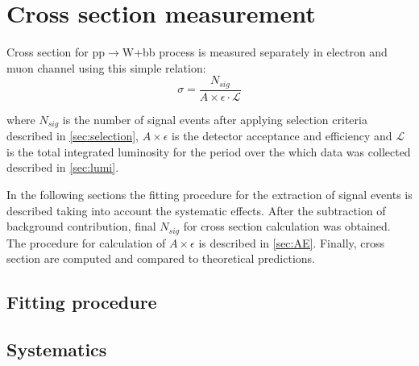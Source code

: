 
\chapter{Cross section measurement} %

\label{Chapter7} %



Cross section for pp$\rightarrow$W+bb process is measured separately in electron and muon channel using this simple relation:
\begin{equation}
\sigma = \frac{N_{sig}}{A\times \epsilon \cdot \mathcal{L}}
\end{equation}

where $N_{sig}$ is the number of signal events after applying selection criteria described in \ref{sec:selection}, $A\times \epsilon$ is the detector acceptance and efficiency and $\mathcal{L}$ is the total integrated luminosity for the period over the which data was collected described in \ref{sec:lumi}. 
\par In the following sections the fitting procedure for the extraction of signal events is described taking into account the systematic effects. After the subtraction of background contribution, final $N_{sig}$ for cross section calculation was obtained. The procedure for calculation of $A\times \epsilon$ is described in \ref{sec:AE}. Finally, cross section are computed and compared to theoretical predictions. 


\section{Fitting procedure}



\section{Systematics}


